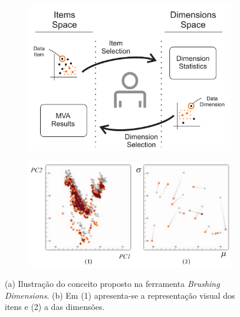 \begin{figure}[h!] \centering
    \begin{subfigure}[b]{0.45\textwidth}
    \centering
    \includegraphics[width=\textwidth]{images/bd1.png}
    \caption{}
    \label{fig:bd1}
  \end{subfigure}%
  \begin{subfigure}[b]{0.55\textwidth}
    \centering
    \includegraphics[width=\textwidth]{images/bd2.png}
    \caption{}
    \label{fig:bd2}
  \end{subfigure}
  \caption[Brushing Dimensions]
  {(a) Ilustração do conceito proposto na ferramenta
  \emph{Brushing Dimensions}. (b) Em (1) apresenta-se a
  representação visual dos itens e (2) a das dimensões.}
  \label{fig:bd}
\end{figure}

